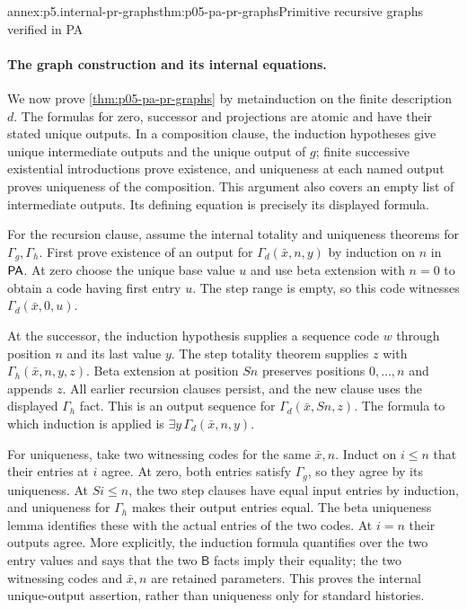 \begin{annexitem}{annex:p5.internal-pr-graphs}{thm:p05-pa-pr-graphs}{Primitive recursive graphs verified in PA}
\paragraph{The graph construction and its internal equations.}
We now prove \cref{thm:p05-pa-pr-graphs} by metainduction on the finite
description \(d\).  The formulas for zero, successor and projections are
atomic and have their stated unique outputs.  In a composition clause,
the induction hypotheses give unique intermediate outputs and the unique
output of \(g\); finite successive existential introductions prove
existence, and uniqueness at each named output proves uniqueness of the
composition.  This argument also covers an empty list of intermediate
outputs.  Its defining equation is precisely its displayed formula.

For the recursion clause, assume the internal totality and uniqueness
theorems for \(\Gamma_g,\Gamma_h\).  First prove existence of an output
for \(\Gamma_d(\bar x,n,y)\) by induction on \(n\) in \(\mathsf{PA}\).
At zero choose the unique base value \(u\) and use beta extension with
\(n=0\) to obtain a code having first entry \(u\).  The step range is
empty, so this code witnesses \(\Gamma_d(\bar x,0,u)\).

At the successor, the induction hypothesis supplies a sequence code \(w\)
through position \(n\) and its last value \(y\).  The step totality
theorem supplies \(z\) with \(\Gamma_h(\bar x,n,y,z)\).
Beta extension at position \(Sn\) preserves positions \(0,\ldots,n\)
and appends \(z\).  All earlier recursion clauses persist, and the new
clause uses the displayed \(\Gamma_h\) fact.  This is an output sequence
for \(\Gamma_d(\bar x,Sn,z)\).  The formula to which induction is
applied is \(\exists y\,\Gamma_d(\bar x,n,y)\).

For uniqueness, take two witnessing codes for the same \(\bar x,n\).
Induct on \(i\leq n\) that their entries at \(i\) agree.  At zero,
both entries satisfy \(\Gamma_g\), so they agree by its uniqueness.
At \(Si\leq n\), the two step clauses have equal input entries by
induction, and uniqueness for \(\Gamma_h\) makes their output entries
equal.  The beta uniqueness lemma identifies these with the actual entries
of the two codes.  At \(i=n\) their outputs agree.  More explicitly,
the induction formula quantifies over the two entry values and says that
the two \(\mathsf B\) facts imply their equality; the two witnessing
codes and \(\bar x,n\) are retained parameters.  This proves the internal
unique-output assertion, rather than uniqueness only for standard histories.


\end{annexitem}
